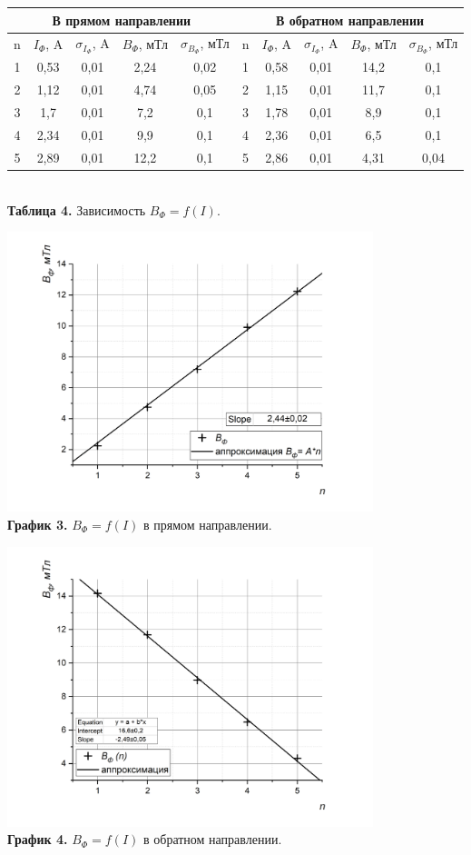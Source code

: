 \documentclass[a4paper, 12pt]{article}%
\begin{document}
\begin{center}
\begin{tabular}{|c|c|c|c|c|c|c|c|c|c|}
\hline
\multicolumn{5}{|c|}{В прямом направлении} & \multicolumn{5}{c|}{В обратном направлении} \\ \hline
n & $I_{\Phi}$, A & $\sigma_{I_{\Phi}}$, A & $B_{\Phi}$, мТл & $\sigma_{B_{\Phi}}$, мТл & n & $I_{\Phi}$, A & $\sigma_{I_{\Phi}}$, A & $B_{\Phi}$, мТл & $\sigma_{B_{\Phi}}$, мТл \\ \hline
1 & 0,53 & 0,01 & 2,24 & 0,02 & 1 & 0,58 & 0,01 & 14,2 & 0,1 \\ \hline
2 & 1,12 & 0,01 & 4,74 & 0,05 & 2 & 1,15 & 0,01 & 11,7 & 0,1 \\ \hline
3 & 1,7 & 0,01 & 7,2 & 0,1 & 3 & 1,78 & 0,01 & 8,9 & 0,1 \\ \hline
4 & 2,34 & 0,01 & 9,9 & 0,1 & 4 & 2,36 & 0,01 & 6,5 & 0,1 \\ \hline
5 & 2,89 & 0,01 & 12,2 & 0,1 & 5 & 2,86 & 0,01 & 4,31 & 0,04 \\ \hline
\end{tabular}\\
\textbf{Таблица 4.} Зависимость $B_{\Phi} = f(I)$.
\end{center}
\begin{center}
\includegraphics[width = 0.8\textwidth]{3.jpg}\\
\textbf{График 3.} $B_{\Phi} = f(I)$ в прямом направлении.
\end{center}
\begin{center}
\includegraphics[width = 0.8\textwidth]{5.jpg}\\
\textbf{График 4.} $B_{\Phi} = f(I)$ в обратном направлении.
\end{center}
\end{document}
